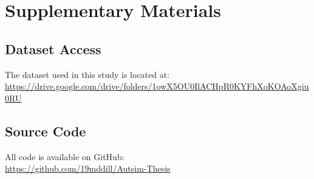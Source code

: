 \documentclass{article}
\begin{document}
\doublespacing


{}
\setcounter{page}{2}


\cleardoublepage


\cleardoublepage


\cleardoublepage


\cleardoublepage


\cleardoublepage

\listoffigures
\cleardoublepage 

\listoftables
\cleardoublepage

%



\tableofcontents
\thispagestyle{empty}
\cleardoublepage 
{}
\setcounter{page}{2}


\setcounter{page}{1}

\cleardoublepage

\cleardoublepage

\cleardoublepage

\cleardoublepage

\cleardoublepage

\cleardoublepage

\printbibliography %

\appendix
\section{Supplementary Materials}
\label{app:supplementary}

\subsection{Dataset Access}
The dataset used in this study is located at: \\
\url{https://drive.google.com/drive/folders/1owX5OU0IlACHpR0KYFhXoKOAoXgiu0RU}

\subsection{Source Code}
All code is available on GitHub: \\
\url{https://github.com/19mddill/Autsim-Thesis}
\end{document}
